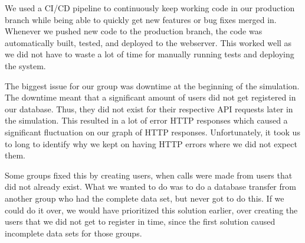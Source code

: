 We used a CI/CD pipeline to continuously keep working code in our production branch while being able to quickly get new features or bug fixes merged in. Whenever we pushed new code to the production branch, the code was automatically built, tested, and deployed to the webserver. This worked well as we did not have to waste a lot of time for manually running tests and deploying the system.


The biggest issue for our group was downtime at the beginning of the simulation. The downtime meant that a significant amount of users did not get registered in our database. Thus, they did not exist for their respective API requests later in the simulation. This resulted in a lot of error HTTP responses which caused a significant fluctuation on our graph of HTTP responses. Unfortunately, it took us to long to identify why we kept on having HTTP errors where we did not expect them.


Some groups fixed this by creating users, when calls were made from users that did not already exist. 
What we wanted to do was to do a database transfer from another group who had the complete data set, but never got to do this. If we could do it over, we would have prioritized this solution earlier, over creating the users that we did not get to register in time, since the first solution caused incomplete data sets for those groups. 

